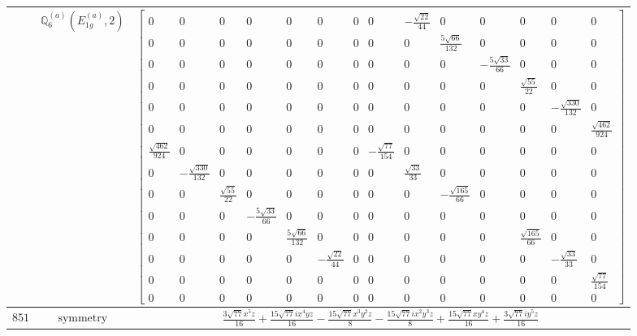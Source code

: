 \documentclass[fleqn,8pt,landscape]{jsarticle}
\begin{document}
\begin{longtable}{ccc}
$  $ & $ \mathbb{Q}_{6}^{(a)}(E_{1g}^{(a)},2) $ & $ \begin{bmatrix} 0 & 0 & 0 & 0 & 0 & 0 & 0 & 0 & - \frac{\sqrt{22}}{44} & 0 & 0 & 0 & 0 & 0 \\ 0 & 0 & 0 & 0 & 0 & 0 & 0 & 0 & 0 & \frac{5 \sqrt{66}}{132} & 0 & 0 & 0 & 0 \\ 0 & 0 & 0 & 0 & 0 & 0 & 0 & 0 & 0 & 0 & - \frac{5 \sqrt{33}}{66} & 0 & 0 & 0 \\ 0 & 0 & 0 & 0 & 0 & 0 & 0 & 0 & 0 & 0 & 0 & \frac{\sqrt{55}}{22} & 0 & 0 \\ 0 & 0 & 0 & 0 & 0 & 0 & 0 & 0 & 0 & 0 & 0 & 0 & - \frac{\sqrt{330}}{132} & 0 \\ 0 & 0 & 0 & 0 & 0 & 0 & 0 & 0 & 0 & 0 & 0 & 0 & 0 & \frac{\sqrt{462}}{924} \\ \frac{\sqrt{462}}{924} & 0 & 0 & 0 & 0 & 0 & 0 & - \frac{\sqrt{77}}{154} & 0 & 0 & 0 & 0 & 0 & 0 \\ 0 & - \frac{\sqrt{330}}{132} & 0 & 0 & 0 & 0 & 0 & 0 & \frac{\sqrt{33}}{33} & 0 & 0 & 0 & 0 & 0 \\ 0 & 0 & \frac{\sqrt{55}}{22} & 0 & 0 & 0 & 0 & 0 & 0 & - \frac{\sqrt{165}}{66} & 0 & 0 & 0 & 0 \\ 0 & 0 & 0 & - \frac{5 \sqrt{33}}{66} & 0 & 0 & 0 & 0 & 0 & 0 & 0 & 0 & 0 & 0 \\ 0 & 0 & 0 & 0 & \frac{5 \sqrt{66}}{132} & 0 & 0 & 0 & 0 & 0 & 0 & \frac{\sqrt{165}}{66} & 0 & 0 \\ 0 & 0 & 0 & 0 & 0 & - \frac{\sqrt{22}}{44} & 0 & 0 & 0 & 0 & 0 & 0 & - \frac{\sqrt{33}}{33} & 0 \\ 0 & 0 & 0 & 0 & 0 & 0 & 0 & 0 & 0 & 0 & 0 & 0 & 0 & \frac{\sqrt{77}}{154} \\ 0 & 0 & 0 & 0 & 0 & 0 & 0 & 0 & 0 & 0 & 0 & 0 & 0 & 0 \end{bmatrix} $ \\ \hline
$ 851 $ & $ \text{symmetry} $ & $ \frac{3 \sqrt{77} x^{5} z}{16} + \frac{15 \sqrt{77} i x^{4} y z}{16} - \frac{15 \sqrt{77} x^{3} y^{2} z}{8} - \frac{15 \sqrt{77} i x^{2} y^{3} z}{8} + \frac{15 \sqrt{77} x y^{4} z}{16} + \frac{3 \sqrt{77} i y^{5} z}{16} $ \\

\end{longtable}
\end{document}
